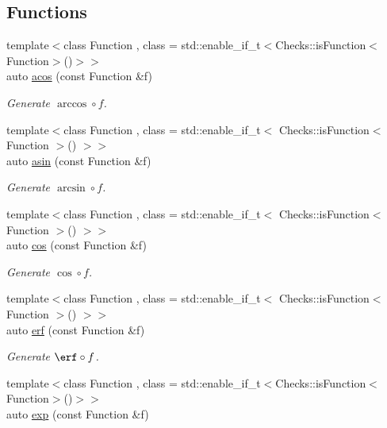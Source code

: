 \subsection*{Functions}
\begin{DoxyCompactItemize}
\item 
{\footnotesize template$<$class Function , class  = std\+::enable\+\_\+if\+\_\+t$<$\+Checks\+::is\+Function$<$\+Function$>$()$>$$>$ }\\auto \hyperlink{group__CMathGroup_gae9b7d3a479bcd8d48cf25f1c29edefb9}{acos} (const Function \&f)
\begin{DoxyCompactList}\small\item\em Generate $ \arccos\circ f $. \end{DoxyCompactList}\item 
{\footnotesize template$<$class Function , class  = std\+::enable\+\_\+if\+\_\+t$<$ Checks\+::is\+Function$<$ Function $>$() $>$$>$ }\\auto \hyperlink{group__CMathGroup_gad26443b289325876cffdaadfca770d51}{asin} (const Function \&f)
\begin{DoxyCompactList}\small\item\em Generate $ \arcsin\circ f $. \end{DoxyCompactList}\item 
{\footnotesize template$<$class Function , class  = std\+::enable\+\_\+if\+\_\+t$<$ Checks\+::is\+Function$<$ Function $>$() $>$$>$ }\\auto \hyperlink{group__CMathGroup_ga7e9b2ac717cd2350663293cb66ba6cbd}{cos} (const Function \&f)
\begin{DoxyCompactList}\small\item\em Generate $ \cos\circ f $. \end{DoxyCompactList}\item 
{\footnotesize template$<$class Function , class  = std\+::enable\+\_\+if\+\_\+t$<$ Checks\+::is\+Function$<$ Function $>$() $>$$>$ }\\auto \hyperlink{group__CMathGroup_gaa0d608a0906520bd48b7e0036e560afa}{erf} (const Function \&f)
\begin{DoxyCompactList}\small\item\em Generate $ \erf\circ f $. \end{DoxyCompactList}\item 
{\footnotesize template$<$class Function , class  = std\+::enable\+\_\+if\+\_\+t$<$\+Checks\+::is\+Function$<$\+Function$>$()$>$$>$ }\\auto \hyperlink{group__CMathGroup_ga00135c8521411f13813f9b972ea4e231}{exp} (const Function \&f)

\end{DoxyCompactItemize}
